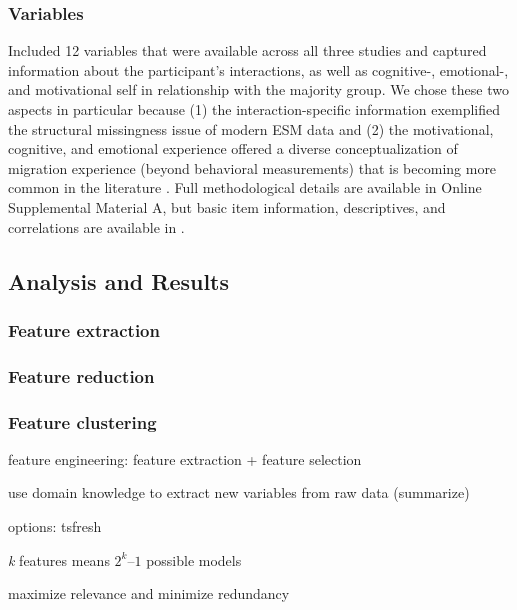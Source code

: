 \subsubsection{Variables}

Included 12 variables that were available across all three studies and
captured information about the participant's interactions, as well as
cognitive-, emotional-, and motivational self in relationship with the
majority group. We chose these two aspects in particular because (1) the
interaction-specific information exemplified the structural missingness
issue of modern ESM data and (2) the motivational, cognitive, and
emotional experience offered a diverse conceptualization of migration
experience (beyond behavioral measurements) that is becoming more common
in the literature \citep[][]{Kreienkamp2022d}. Full methodological
details are available in Online Supplemental Material A, but basic item
information, descriptives, and correlations are available in
.

\subsection{Analysis and Results}

\subsubsection{Feature extraction}

\subsubsection{Feature reduction}

\subsubsection{Feature clustering}

feature engineering: feature extraction + feature selection

use domain knowledge to extract new variables from raw data (summarize)

options: tsfresh \citep[][]{christ2018}

\textit{k} features means \(2^k – 1\) possible models

maximize relevance and minimize redundancy
